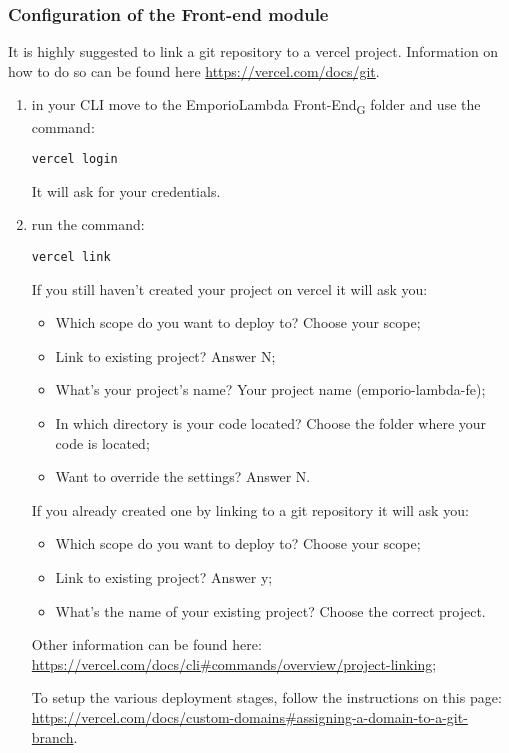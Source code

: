 \subsubsection{Configuration of the Front-end module}
It is highly suggested to link a git repository to a vercel project. Information on how to do so can be found here \url{https://vercel.com/docs/git}.
\begin{enumerate}
\item in your CLI move to the EmporioLambda Front-End\textsubscript{G} folder and use the command:\begin{center}\texttt{vercel login}\end{center}It will ask for your credentials.
\item run the command:\begin{center}\texttt{vercel link}\end{center} If you still haven't created your project on vercel it will ask you:
\begin{itemize}
\item Which scope do you want to deploy to? Choose your scope;
\item Link to existing project? Answer N;
\item What’s your project’s name? Your project name (emporio-lambda-fe);
\item In which directory is your code located? Choose the folder where your code is located;
\item Want to override the settings? Answer N.
\end{itemize}
If you already created one by linking to a git repository it will ask you:
\begin{itemize}
\item Which scope do you want to deploy to? Choose your scope;
\item Link to existing project? Answer y;
\item What’s the name of your existing project? Choose the correct project.
\end{itemize}
Other information can be found here: \url{https://vercel.com/docs/cli\#commands/overview/project-linking};

To setup the various deployment stages, follow the instructions on this page: \url{https://vercel.com/docs/custom-domains#assigning-a-domain-to-a-git-branch}.
\end{enumerate}